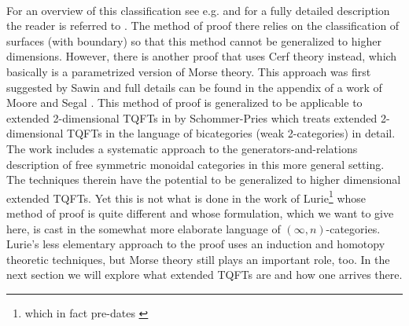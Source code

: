 \\
For an overview of this classification see e.g. \cite{0a816f4c} and for a fully detailed description the reader is referred to \cite{bf5195ee}. The method of proof there relies on the classification of surfaces (with boundary) so that this method cannot be generalized to higher dimensions. However, there is another proof that uses Cerf theory instead, which basically is a parametrized version of Morse theory. This approach was first suggested by Sawin \cite{222239ff} and full details can be found in the appendix of a work of Moore and Segal \cite{ee9a1449}. This method of proof is generalized to be applicable to extended 2-dimensional TQFTs in \cite{d37d0fca} by Schommer-Pries which treats extended 2-dimensional TQFTs in the language of bicategories (weak 2-categories) in detail. The work includes a systematic approach to the generators-and-relations description of free symmetric monoidal categories in this more general setting. The techniques therein have the potential to be generalized to higher dimensional extended TQFTs. Yet this is not what is done in the work of Lurie\footnote{which in fact pre-dates \cite{d37d0fca}} \cite{dfcdc48c} whose method of proof is quite different and whose formulation, which we want to give here, is cast in the somewhat more elaborate language of $(\infty,n)$-categories. Lurie's less elementary approach to the proof uses an induction and homotopy theoretic techniques, but Morse theory still plays an important role, too. In the next section we will explore what extended TQFTs are and how one arrives there.
